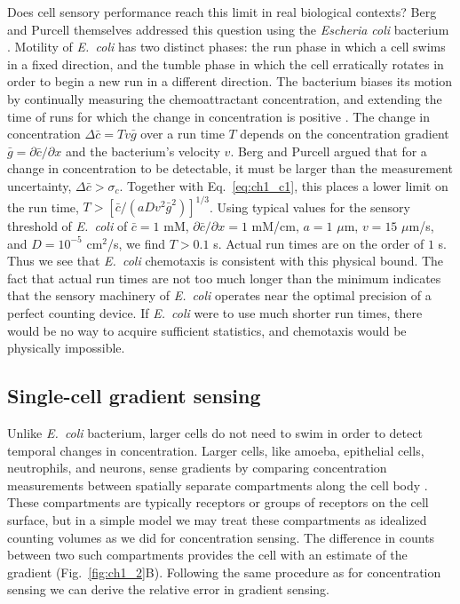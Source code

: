 Does cell sensory performance reach this limit in real biological contexts? Berg and Purcell themselves addressed this question using the \textit{Escheria coli} bacterium \cite{berg1977physics}. Motility of \textit{E.\ coli} has two distinct phases: the run phase in which a cell swims in a fixed direction, and the tumble phase in which the cell erratically rotates in order to begin a new run in a different direction. The bacterium biases its motion by continually measuring the chemoattractant concentration, and extending the time of runs for which the change in concentration is positive \cite{berg1977physics,dahlquist1976studies}. The change in concentration $\Delta \bar{c} = Tv\bar{g}$
over a run time $T$ depends on the concentration gradient
$\bar{g} = \partial \bar{c} / \partial x$
and the bacterium's velocity $v$. Berg and Purcell argued that for a change in concentration to be detectable, it must be larger than the measurement uncertainty,
$\Delta \bar{c} > \sigma_c $.
Together with Eq.\ \ref{eq:ch1_c1}, this places a lower limit on the run time,
$T > [ \bar{c}/(aDv^2\bar{g}^2)]^{1/3}$.
Using typical values \cite{berg1977physics} for the sensory threshold of \textit{E.\ coli} of
$\bar{c} = 1$ mM, $\partial \bar{c} / \partial x = 1$ mM/cm, $a=1$ $\mu$m, $v=15$ $\mu$m/s, and $D=10^{-5}$ cm$^2$/s, we find $T > 0.1$ s.
Actual run times are on the order of $1$ s. Thus we see that \textit{E.\ coli} chemotaxis is consistent with this physical bound. The fact that actual run times are not too much longer than the minimum indicates that the sensory machinery of \textit{E.\ coli} operates near the optimal precision of a perfect counting device. If \textit{E.\ coli} were to use much shorter run times, there would be no way to acquire sufficient statistics, and chemotaxis would be physically impossible.

\subsection{Single-cell gradient sensing}

Unlike \textit{E.\ coli} bacterium, larger cells do not need to swim in order to detect temporal changes in concentration. Larger cells, like amoeba, epithelial cells, neutrophils, and neurons, sense gradients by comparing concentration measurements between spatially separate compartments along the cell body \cite{jilkine2011comparison}. These compartments are typically receptors or groups of receptors on the cell surface, but in a simple model we may treat these compartments as idealized counting volumes as we did for concentration sensing. The difference in counts between two such compartments provides the cell with an estimate of the gradient (Fig.\ \ref{fig:ch1_2}B). Following the same procedure as for concentration sensing we can derive the relative error in gradient sensing.

